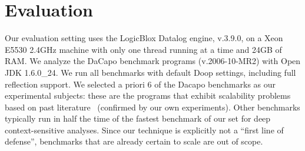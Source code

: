 \section{Evaluation}

Our evaluation setting uses the LogicBlox Datalog engine, v.3.9.0, on
a Xeon E5530 2.4GHz machine with only one thread running at a time and
24GB of RAM. We analyze the DaCapo benchmark programs (v.2006-10-MR2)
with Open JDK 1.6.0\_24. We run all benchmarks with default Doop
settings, including full reflection support.
We selected a priori 6 of the Dacapo benchmarks as our experimental
subjects: these are the programs that exhibit scalability problems
based on past literature~\cite{pldi:2013:Kastrinis} (confirmed by our own
experiments). Other benchmarks typically run in half the time of the
fastest benchmark of our set for deep context-sensitive analyses.
Since our technique is explicitly not a ``first line of defense'',
benchmarks that are already certain to scale are out of scope.


